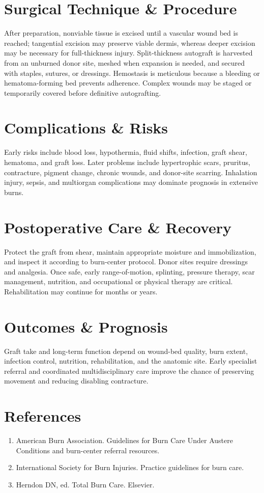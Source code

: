 \section*{Surgical Technique \& Procedure}
After preparation, nonviable tissue is excised until a vascular wound bed is reached; tangential excision may preserve viable dermis, whereas deeper excision may be necessary for full-thickness injury. Split-thickness autograft is harvested from an unburned donor site, meshed when expansion is needed, and secured with staples, sutures, or dressings. Hemostasis is meticulous because a bleeding or hematoma-forming bed prevents adherence. Complex wounds may be staged or temporarily covered before definitive autografting.

\section*{Complications \& Risks}
Early risks include blood loss, hypothermia, fluid shifts, infection, graft shear, hematoma, and graft loss. Later problems include hypertrophic scars, pruritus, contracture, pigment change, chronic wounds, and donor-site scarring. Inhalation injury, sepsis, and multiorgan complications may dominate prognosis in extensive burns.

\section*{Postoperative Care \& Recovery}
Protect the graft from shear, maintain appropriate moisture and immobilization, and inspect it according to burn-center protocol. Donor sites require dressings and analgesia. Once safe, early range-of-motion, splinting, pressure therapy, scar management, nutrition, and occupational or physical therapy are critical. Rehabilitation may continue for months or years.

\section*{Outcomes \& Prognosis}
Graft take and long-term function depend on wound-bed quality, burn extent, infection control, nutrition, rehabilitation, and the anatomic site. Early specialist referral and coordinated multidisciplinary care improve the chance of preserving movement and reducing disabling contracture.

\section*{References}
\begin{enumerate}
\item American Burn Association. Guidelines for Burn Care Under Austere Conditions and burn-center referral resources.
\item International Society for Burn Injuries. Practice guidelines for burn care.
\item Herndon DN, ed. Total Burn Care. Elsevier.
\end{enumerate}
